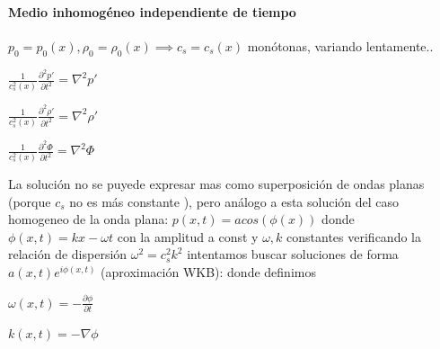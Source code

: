 \documentclass{article}
\begin{document}
\paragraph{Medio inhomogéneo independiente de tiempo} $p_0 = p_0(x),\rho_0 = \rho_0(x)\implies c_s = c_s(x)$ monótonas, variando lentamente..
\begin{description}  
\item $\frac{1}{c_s^{2}(x)} \frac{\partial^{2} p\prime}{\partial t^{2}} = \nabla^{2} p\prime    $
\item $\frac{1}{c_s^{2}(x)} \frac{\partial^{2} \rho\prime}{\partial t^{2}} = \nabla^{2} \rho\prime    $
\item $\frac{1}{c_s^{2}(x)} \frac{\partial^{2} \Phi}{\partial t^{2}} = \nabla^{2} \Phi    $
\item La solución no se puyede expresar mas como superposición de ondas planas (porque $c_s$ no es más constante ), pero análogo a esta solución del caso homogeneo de la onda plana:
 $p(x,t)=a cos(\phi(x))$ donde $\phi(x,t) = kx-\omega t$ con la amplitud a const y $\omega, k$ constantes verificando la relación de dispersión $\omega^{2} = c_s^2 k^2  $ intentamos  buscar soluciones de forma $a(x,t) e^{i\phi(x,t)}$ (aproximación WKB): 
 donde definimos 
\item $\omega(x,t) = -\frac{\partial \phi}{\partial t}$
\item $k(x,t) = -\nabla \phi$
\end{description}
\end{document}

